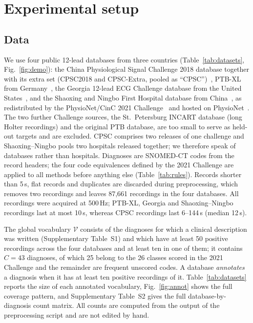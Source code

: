 \section{Experimental setup}\label{sec:setup}

\subsection{Data}\label{sec:data}
We use four public 12-lead databases from three countries (Table~\ref{tab:datasets}, Fig.~\ref{fig:demo}): the China Physiological Signal Challenge 2018 database together with its extra set (CPSC2018 and CPSC-Extra, pooled as ``CPSC'')~\cite{liu_cpsc2018,perez2020}, PTB-XL from Germany~\cite{wagner2020}, the Georgia 12-lead ECG Challenge database from the United States~\cite{perez2020}, and the Shaoxing and Ningbo First Hospital database from China~\cite{zheng2020,zheng2022ningbo}, as redistributed by the PhysioNet/CinC 2021 Challenge~\cite{reyna2022} and hosted on PhysioNet~\cite{goldberger2000}. The two further Challenge sources, the St.~Petersburg INCART database (long Holter recordings) and the original PTB database, are too small to serve as held-out targets and are excluded. CPSC comprises two releases of one challenge and Shaoxing--Ningbo pools two hospitals released together; we therefore speak of databases rather than hospitals. Diagnoses are SNOMED-CT codes from the record headers; the four code equivalences defined by the 2021 Challenge are applied to all methods before anything else (Table~\ref{tab:rules}). Records shorter than 5\,s, flat records and duplicates are discarded during preprocessing, which removes two recordings and leaves 87{,}661 recordings in the four databases. All recordings were acquired at 500\,Hz; PTB-XL, Georgia and Shaoxing--Ningbo recordings last at most 10\,s, whereas CPSC recordings last 6--144\,s (median 12\,s).

The global vocabulary $\mathcal{V}$ consists of the diagnoses for which a clinical description was written (Supplementary Table~S1) and which have at least 50 positive recordings across the four databases and at least ten in one of them; it contains $C=43$ diagnoses, of which 25 belong to the 26 classes scored in the 2021 Challenge and the remainder are frequent unscored codes. A database \emph{annotates} a diagnosis when it has at least ten positive recordings of it. Table~\ref{tab:datasets} reports the size of each annotated vocabulary, Fig.~\ref{fig:annot} shows the full coverage pattern, and Supplementary Table~S2 gives the full database-by-diagnosis count matrix. All counts are computed from the output of the preprocessing script and are not edited by hand.

